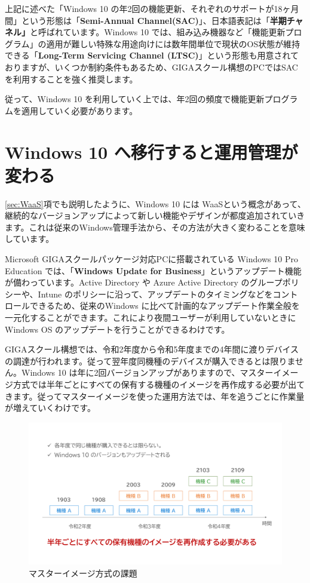 上記に述べた「Windows 10 の年2回の機能更新、それぞれのサポートが18ヶ月間」という形態は「\textbf{Semi-Annual Channel(SAC)}」、日本語表記は「\textbf{半期チャネル」}と呼ばれています。Windows 10 では、組み込み機器など「機能更新プログラム」の適用が難しい特殊な用途向けには数年間単位で現状のOS状態が維持できる「\textbf{Long-Term Servicing Channel (LTSC)}」という形態も用意されておりますが、いくつか制約条件もあるため、GIGAスクール構想のPCではSACを利用することを強く推奨します。

従って、Windows 10 を利用していく上では、年2回の頻度で機能更新プログラムを適用していく必要があります。

\section{Windows 10 へ移行すると運用管理が変わる}
\label{sec:Win10の運用}

\ref{sec:WaaS}項でも説明したように、Windows 10 には WaaSという概念があって、継続的なバージョンアップによって新しい機能やデザインが都度追加されていきます。これは従来のWindows管理手法から、その方法が大きく変わることを意味しています。

Microsoft GIGAスクールパッケージ対応PCに搭載されている Windows 10 Pro Education では、「\textbf{Windows Update for Business}」というアップデート機能が備わっています。Active Directory や Azure Active Directory のグループポリシーや、Intune のポリシーに沿って、アップデートのタイミングなどをコントロールできるため、従来のWindows に比べて計画的なアップデート作業全般を一元化することができます。これにより夜間ユーザーが利用していないときに Windows OS のアップデートを行うことができるわけです。

GIGAスクール構想では、令和2年度から令和5年度までの4年間に渡りデバイスの調達が行われます。従って翌年度同機種のデバイスが購入できるとは限りません。Windows 10 は年に2回バージョンアップがありますので、マスターイメージ方式では半年ごとにすべての保有する機種のイメージを再作成する必要が出てきます。従ってマスターイメージを使った運用方法では、年を追うごとに作業量が増えていくわけです。

\begin{figure}[htbp]
    \centering
    \includegraphics[width=14cm]{figures/MasterImage2.png}
    \caption{マスターイメージ方式の課題}
    \label{fig:MasterImage2}
\end{figure}

